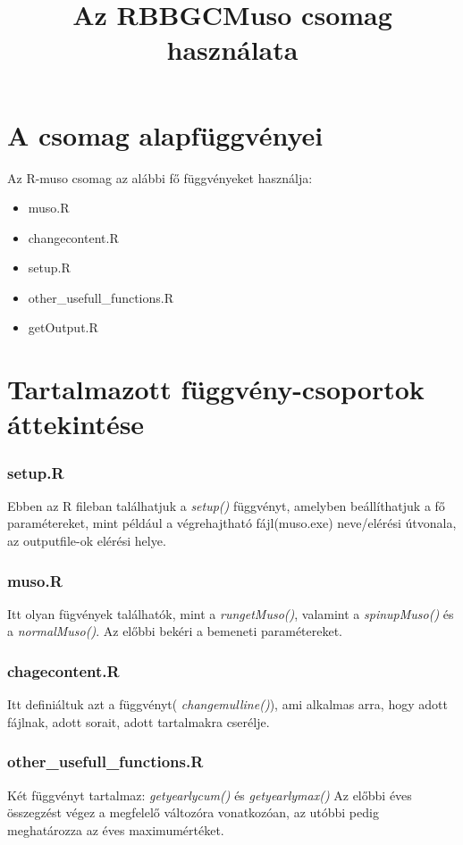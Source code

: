 \documentclass[12pt,a4paper]{article}
\title{Az RBBGCMuso csomag használata}
\begin{document}
\maketitle
\section{A csomag alapfüggvényei}

Az R-muso csomag az alábbi fő függvényeket használja:

\begin{itemize}
\item muso.R
\item changecontent.R
\item setup.R
\item other\_usefull\_functions.R
\item getOutput.R
\end{itemize}
\section{Tartalmazott függvény-csoportok áttekintése}
\subsubsection*{setup.R}
Ebben az R fileban találhatjuk a \textit{setup()} függvényt, amelyben beállíthatjuk a fő paramétereket, mint például a végrehajtható fájl(muso.exe) neve/elérési útvonala, az outputfile-ok elérési helye.
\subsubsection*{muso.R}
Itt olyan fügvények találhatók, mint a \textit{rungetMuso()}, valamint a \textit{spinupMuso()} és a \textit{normalMuso()}. Az előbbi bekéri a bemeneti paramétereket.  
\subsubsection*{chagecontent.R}
Itt definiáltuk azt a függvényt( \textit{changemulline()}), ami alkalmas arra, hogy adott fájlnak, adott sorait, adott tartalmakra cserélje.
\subsubsection*{other\_usefull\_functions.R}
Két függvényt tartalmaz: \textit{getyearlycum()} és \textit{getyearlymax()} Az előbbi éves összegzést végez a megfelelő változóra vonatkozóan, az utóbbi pedig meghatározza az éves maximumértéket.
\end{document}
